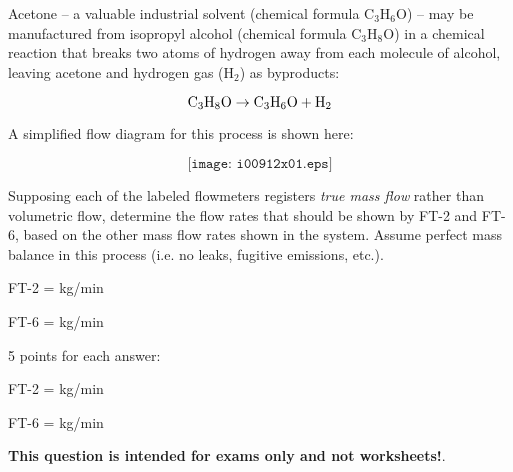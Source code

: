 

Acetone -- a valuable industrial solvent (chemical formula C$_{3}$H$_{6}$O) -- may be manufactured from isopropyl alcohol (chemical formula C$_{3}$H$_{8}$O) in a chemical reaction that breaks two atoms of hydrogen away from each molecule of alcohol, leaving acetone and hydrogen gas (H$_{2}$) as byproducts:

$$\hbox{C}_3\hbox{H}_8\hbox{O} \rightarrow \hbox{C}_3\hbox{H}_6\hbox{O} + \hbox{H}_2$$

A simplified flow diagram for this process is shown here:

$$\texttt{[image: i00912x01.eps]}$$

Supposing each of the labeled flowmeters registers {\it true mass flow} rather than volumetric flow, determine the flow rates that should be shown by FT-2 and FT-6, based on the other mass flow rates shown in the system.  Assume perfect mass balance in this process (i.e. no leaks, fugitive emissions, etc.).

\vskip 10pt

FT-2 = \underbar{\hskip 50pt} kg/min

\vskip 10pt

FT-6 = \underbar{\hskip 50pt} kg/min







5 points for each answer:

\vskip 10pt

FT-2 =  kg/min

\vskip 10pt

FT-6 =  kg/min







{\bf This question is intended for exams only and not worksheets!}.



